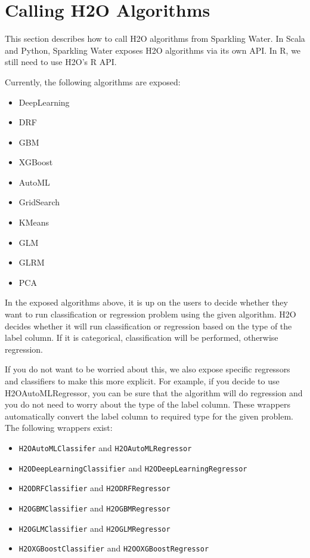 \documentclass{standalone}
\begin{document}
	\section{Calling H2O Algorithms}

	This section describes how to call H2O algorithms from Sparkling Water. In Scala and Python, Sparkling Water
	exposes H2O algorithms via its own API. In R, we still need to use H2O's R API.

	Currently, the following algorithms are exposed:

	\begin{itemize}
		\item DeepLearning
		\item DRF
		\item GBM
		\item XGBoost
		\item AutoML
		\item GridSearch
		\item KMeans
		\item GLM
		\item GLRM
		\item PCA
	\end{itemize}

	In the exposed algorithms above, it is up on the users to decide whether they want to run classification or
	regression problem using the given algorithm. H2O decides whether it will run classification or regression based
	on the type of the label column. If it is categorical, classification will be performed, otherwise regression.

	If you do not want to be worried about this, we also expose specific regressors and classifiers to make this more
	explicit. For example, if you decide to use H2OAutoMLRegressor, you can be sure that the algorithm will do regression
	and you do not need to worry about the type of the label column. These wrappers automatically convert the label
	column to required type for the given problem. The following wrappers exist:

	\begin{itemize}
		\item \texttt{H2OAutoMLClassifer} and \texttt{H2OAutoMLRegressor}
		\item \texttt{H2ODeepLearningClassifier} and \texttt{H2ODeepLearningRegressor}
		\item \texttt{H2ODRFClassifier} and \texttt{H2ODRFRegressor}
		\item \texttt{H2OGBMClassifier} and \texttt{H2OGBMRegressor}
		\item \texttt{H2OGLMClassifier} and \texttt{H2OGLMRegressor}
		\item \texttt{H2OXGBoostClassifier} and \texttt{H2OOXGBoostRegressor}
	\end{itemize}
\end{document}
